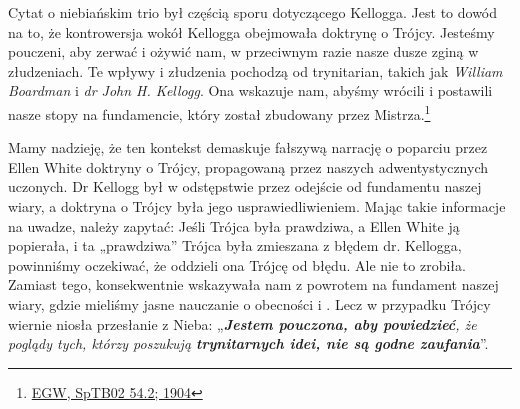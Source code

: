 Cytat o niebiańskim trio był częścią sporu dotyczącego Kellogga. Jest to dowód na to, że kontrowersja wokół Kellogga obejmowała doktrynę o Trójcy. Jesteśmy pouczeni, aby zerwać  i ożywić  nam, w przeciwnym razie nasze dusze zginą w złudzeniach. Te wpływy i złudzenia pochodzą od trynitarian, takich jak \textit{William Boardman} i \textit{dr John H. Kellogg}. Ona wskazuje nam, abyśmy wrócili i postawili nasze stopy na fundamencie, który został zbudowany przez Mistrza.\footnote{\href{https://egwwritings.org/?ref=en_SpTB02.54.2&para=417.276}{EGW, SpTB02 54.2; 1904}}

Mamy nadzieję, że ten kontekst demaskuje fałszywą narrację o poparciu przez Ellen White doktryny o Trójcy, propagowaną przez naszych adwentystycznych uczonych. Dr Kellogg był w odstępstwie przez odejście od fundamentu naszej wiary, a doktryna o Trójcy była jego usprawiedliwieniem. Mając takie informacje na uwadze, należy zapytać: Jeśli Trójca była prawdziwa, a Ellen White ją popierała, i ta „prawdziwa” Trójca była zmieszana z błędem dr. Kellogga, powinniśmy oczekiwać, że oddzieli ona Trójcę od błędu. Ale nie to zrobiła. Zamiast tego, konsekwentnie wskazywała nam z powrotem na fundament naszej wiary, gdzie mieliśmy jasne nauczanie o obecności i . Lecz w przypadku Trójcy wiernie niosła przesłanie z Nieba: „\textit{\textbf{Jestem pouczona, aby powiedzieć}, że poglądy tych, którzy poszukują \textbf{trynitarnych idei, nie są godne zaufania}}”.
